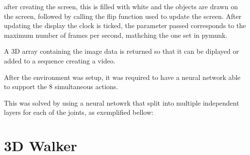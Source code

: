 after creating the screen, this is filled with white and the objects are drawn on the screen, followed by calling the flip function used to update the screen.
After updating the display the clock is ticked, the parameter passed corresponds to the maximum number of frames per second, mathching the one set in pymunk.

A 3D array containing the image data is returned so that it can be diplayed or added to a sequence creating a video. 

After the environment was setup, it was required to have a neural network able to support the 8 simultaneous actions.

This was solved by using a neural netowrk that split into multiple independent layers for each of the joints, as exemplified bellow:

\begin{figure}[H]
\end{figure}

\section{3D Walker}



